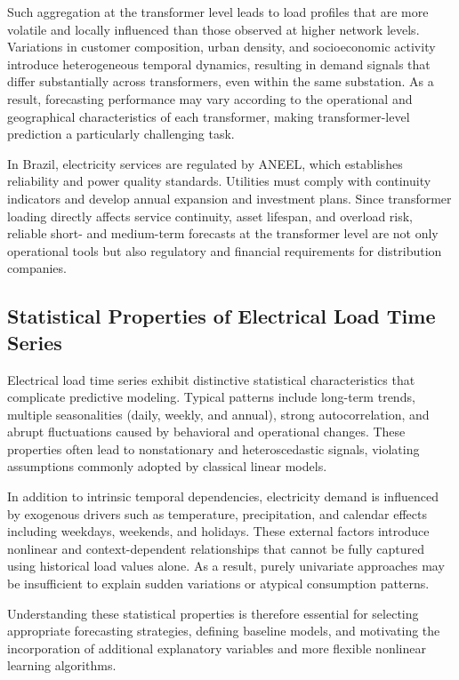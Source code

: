 Such aggregation at the transformer level leads to load profiles that are more volatile and locally influenced than those observed at higher network levels. Variations in customer composition, urban density, and socioeconomic activity introduce heterogeneous temporal dynamics, resulting in demand signals that differ substantially across transformers, even within the same substation. As a result, forecasting performance may vary according to the operational and geographical characteristics of each transformer, making transformer-level prediction a particularly challenging task.

In Brazil, electricity services are regulated by ANEEL, which establishes reliability and power quality standards. Utilities must comply with continuity indicators and develop annual expansion and investment plans. Since transformer loading directly affects service continuity, asset lifespan, and overload risk, reliable short- and medium-term forecasts at the transformer level are not only operational tools but also regulatory and financial requirements for distribution companies.


\subsection{Statistical Properties of Electrical Load Time Series}

Electrical load time series exhibit distinctive statistical characteristics that complicate predictive modeling. Typical patterns include long-term trends, multiple seasonalities (daily, weekly, and annual), strong autocorrelation, and abrupt fluctuations caused by behavioral and operational changes. These properties often lead to nonstationary and heteroscedastic signals, violating assumptions commonly adopted by classical linear models.

In addition to intrinsic temporal dependencies, electricity demand is influenced by exogenous drivers such as temperature, precipitation, and calendar effects including weekdays, weekends, and holidays. These external factors introduce nonlinear and context-dependent relationships that cannot be fully captured using historical load values alone. As a result, purely univariate approaches may be insufficient to explain sudden variations or atypical consumption patterns.

Understanding these statistical properties is therefore essential for selecting appropriate forecasting strategies, defining baseline models, and motivating the incorporation of additional explanatory variables and more flexible nonlinear learning algorithms.

